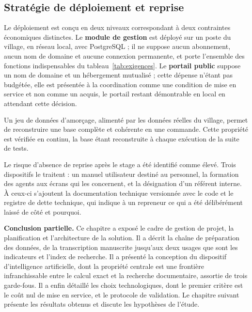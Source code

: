 \subsection{Stratégie de déploiement et reprise}

Le déploiement est conçu en deux niveaux correspondant à deux contraintes économiques distinctes. Le \textbf{module de gestion} est déployé sur un poste du village, en réseau local, avec PostgreSQL ; il ne suppose aucun abonnement, aucun nom de domaine et aucune connexion permanente, et porte l'ensemble des fonctions indispensables du tableau~\ref{tab:exigences}. Le \textbf{portail public} suppose un nom de domaine et un hébergement mutualisé ; cette dépense n'étant pas budgétée, elle est présentée à la coordination comme une condition de mise en service et non comme un acquis, le portail restant démontrable en local en attendant cette décision.

Un jeu de données d'amorçage, alimenté par les données réelles du village, permet de reconstruire une base complète et cohérente en une commande. Cette propriété est vérifiée en continu, la base étant reconstruite à chaque exécution de la suite de tests.

Le risque d'absence de reprise après le stage a été identifié comme élevé. Trois dispositifs le traitent : un manuel utilisateur destiné au personnel, la formation des agents aux écrans qui les concernent, et la désignation d'un référent interne. À ceux-ci s'ajoutent la documentation technique versionnée avec le code et le registre de dette technique, qui indique à un repreneur ce qui a été délibérément laissé de côté et pourquoi.

\vspace{1em}
\noindent\textbf{Conclusion partielle.} Ce chapitre a exposé le cadre de gestion de projet, la planification et l'architecture de la solution. Il a décrit la chaîne de préparation des données, de la transcription manuscrite jusqu'aux deux usages que sont les indicateurs et l'index de recherche. Il a présenté la conception du dispositif d'intelligence artificielle, dont la propriété centrale est une frontière infranchissable entre le calcul exact et la recherche documentaire, assortie de trois garde-fous. Il a enfin détaillé les choix technologiques, dont le premier critère est le coût nul de mise en service, et le protocole de validation. Le chapitre suivant présente les résultats obtenus et discute les hypothèses de l'étude.
